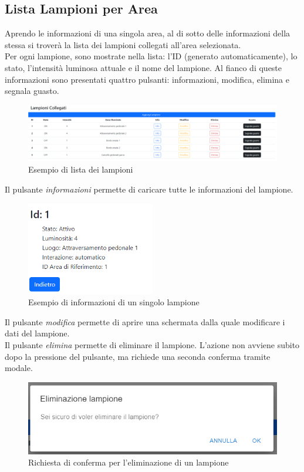 \documentclass[a4paper, 12pt]{article}
\begin{document}
\subsection{Lista Lampioni per Area}
Aprendo le informazioni di una singola area, al di sotto delle informazioni della stessa si troverà la lista dei lampioni collegati all'area selezionata.\\
Per ogni lampione, sono mostrate nella lista: l'ID (generato automaticamente), lo stato, l'intensità luminosa attuale e il nome del lampione. Al fianco di queste informazioni sono presentati quattro pulsanti: informazioni, modifica, elimina e segnala guasto. \\
\begin{figure}[H]
\centering
\includegraphics[width=\textwidth]{ListaLampioni}
\caption{Esempio di lista dei lampioni}
\end{figure}
Il pulsante \textit{informazioni} permette di caricare tutte le informazioni del lampione.\\
\begin{figure}[H]
\centering
\includegraphics[width=0.5\textwidth]{InfoLampione}
\caption{Esempio di informazioni di un singolo lampione}
\end{figure}
Il pulsante \textit{modifica} permette di aprire una schermata dalla quale modificare i dati del lampione.\\
Il pulsante \textit{elimina} permette di eliminare il lampione. L'azione non avviene subito dopo la pressione del pulsante, ma richiede una seconda conferma tramite modale. \\
\begin{figure}[H]
\centering
\includegraphics[width=\textwidth]{ModaleEliminazioneLampione}
\caption{Richiesta di conferma per l'eliminazione di un lampione }
\end{figure}
\end{document}
